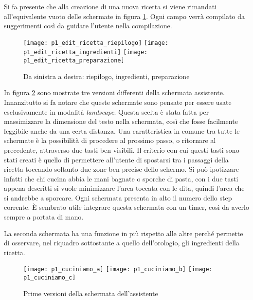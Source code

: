 Si fa presente che alla creazione di una nuova ricetta si viene rimandati all'equivalente vuoto delle schermate in figura \ref{fig:p1_edit_ricetta}.
Ogni campo verrà compilato da suggerimenti così da guidare l'utente nella compilazione.

\begin{figure}[ht]
  \begin{center}
    \texttt{[image: p1\_edit\_ricetta\_riepilogo]}
    \texttt{[image: p1\_edit\_ricetta\_ingredienti]}
    \texttt{[image: p1\_edit\_ricetta\_preparazione]}
    \caption{Da sinistra a destra: riepilogo, ingredienti, preparazione}
    \label{fig:p1_edit_ricetta}
  \end{center}
\end{figure}


In figura \ref{fig:p1_cuciniamo} sono mostrate tre versioni differenti della schermata assistente.
Innanzitutto si fa notare che queste schermate sono pensate per essere usate esclusivamente in modalità \textit{landscape}.
Questa scelta è stata fatta per massimizzare la dimensione del testo nella schermata, così che fosse facilmente leggibile anche da una certa distanza.
Una caratteristica in comune tra tutte le schermate è la possibilità di procedere al prossimo passo, o ritornare al precedente, attraverso due tasti ben visibili.
Il criterio con cui questi tasti sono stati creati è quello di permettere all'utente di spostarsi tra i passaggi della ricetta toccando soltanto due zone ben precise dello schermo.
Si può ipotizzare infatti che chi cucina abbia le mani bagnate o sporche di pasta, con i due tasti appena descritti si vuole minimizzare l'area toccata con le dita, quindi l'area che si andrebbe a sporcare.
Ogni schermata presenta in alto il numero dello step corrente.
È sembrato utile integrare questa schermata con un timer, così da averlo sempre a portata di mano.

La seconda schermata ha una funzione in più rispetto alle altre perché permette di osservare, nel riquadro sottostante a quello dell'orologio, gli ingredienti della ricetta.

\clearpage
\begin{figure}[ht]
  \begin{center}
    \texttt{[image: p1\_cuciniamo\_a]}
    \texttt{[image: p1\_cuciniamo\_b]}
    \texttt{[image: p1\_cuciniamo\_c]}
    \caption{Prime versioni della schermata dell'assistente}
    \label{fig:p1_cuciniamo}
  \end{center}
\end{figure}

